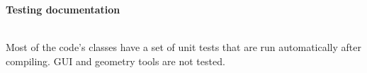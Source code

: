 \documentclass[a4paper,12pt]{article}
\begin{document}
\centerline{\huge \textbf{Testing documentation}} \hspace*{\fill}
\\
Most of the code's classes have a set of unit tests that are run automatically after compiling. GUI and geometry tools are not tested.
\end{document}
